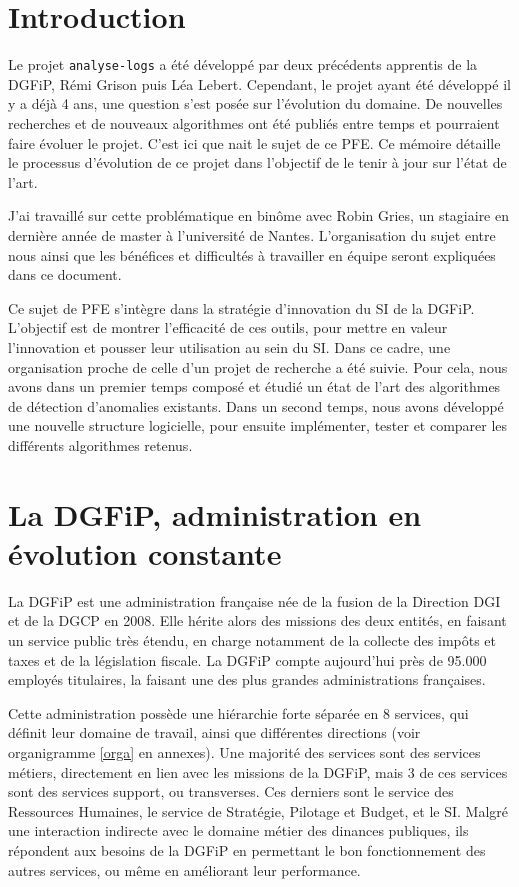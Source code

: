 \documentclass[openany, 11pt]{memoir}
\newcommand\chapters[1]{
	\chapter*{#1}
	\addcontentsline{toc}{chapter}{#1}
}
\begin{document}
\mainmatter
\pagestyle{fancy}
\glsresetall
\chapters{Introduction}

Le projet \texttt{analyse-logs} a été développé par deux précédents apprentis de la \gls{DGFiP}, Rémi Grison puis Léa Lebert. Cependant, le projet ayant été développé il y a déjà 4 ans, une question s'est posée sur l'évolution du domaine. De nouvelles recherches et de nouveaux algorithmes ont été publiés entre temps et pourraient faire évoluer le projet. C'est ici que nait le sujet de ce PFE. Ce mémoire détaille le processus d'évolution de ce projet dans l'objectif de le tenir à jour sur l'état de l'art.

\bigskip
J'ai travaillé sur cette problématique en binôme avec Robin Gries, un stagiaire en dernière année de master à l'université de Nantes. L'organisation du sujet entre nous ainsi que les bénéfices et difficultés à travailler en équipe seront expliquées dans ce document.

\bigskip
Ce sujet de PFE s'intègre dans la stratégie d'innovation du \gls{SI} de la \gls{DGFiP}. L'objectif est de montrer l'efficacité de ces outils, pour mettre en valeur l'innovation et pousser leur utilisation au sein du \gls{SI}. Dans ce cadre, une organisation proche de celle d'un projet de recherche a été suivie. Pour cela, nous avons dans un premier temps composé et étudié un état de l'art des algorithmes de détection d'anomalies existants. Dans un second temps, nous avons développé une nouvelle structure logicielle, pour ensuite implémenter, tester et comparer les différents algorithmes retenus.

\newpage
\chapter{La DGFiP, administration en évolution constante}
\label{dgfip}
La \gls{DGFiP} est une administration française née de la fusion de la Direction \gls{DGI} et de la \gls{DGCP} en 2008. Elle hérite alors des missions des deux entités, en faisant un service public très étendu, en charge notamment de la collecte des impôts et taxes et de la législation fiscale. La DGFiP compte aujourd'hui près de 95.000 employés titulaires, la faisant une des plus grandes administrations françaises.

Cette administration possède une hiérarchie forte séparée en 8 services, qui définit leur domaine de travail, ainsi que différentes directions (voir organigramme \ref{orga} en annexes). Une majorité des services sont des services métiers, directement en lien avec les missions de la \gls{DGFiP}, mais 3 de ces services sont des services support, ou \glspl{transverse}. Ces derniers sont le service des Ressources Humaines, le service de Stratégie, Pilotage et Budget, et le \gls{SI}. Malgré une interaction indirecte avec le domaine métier des dinances publiques, ils répondent aux besoins de la DGFiP en permettant le bon fonctionnement des autres services, ou même en améliorant leur performance.
\end{document}
